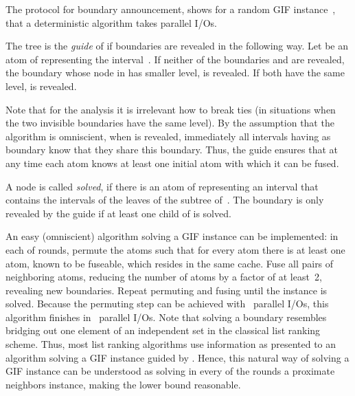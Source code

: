 \documentclass[envcountsame]{llncs}
\def\bO#1{\printmath{\mathcal{O}\left(#1\right)}}
\def\bOm#1{\printmath{\Omega \left(#1\right)}}
\begin{document}
The protocol for boundary announcement, shows for a random GIF instance~\gifInstance, that a deterministic algorithm takes \bOm{\log^2\inputSize} parallel I/Os.

\begin{definition}
\label{definitionAnnouncingGuide}
	The tree \binaryTreeOf{\gifInstance} is the \emph{guide} of \gifInstance if boundaries are revealed in the following way.
        Let  be an atom of \gifInstance representing the interval~.
        If neither of the boundaries   and  are revealed, the boundary whose node in \binaryTreeOf{\gifInstance} has smaller level, is revealed. 
        If both have the same level,  is revealed. 
\end{definition}

Note that for the analysis it is irrelevant how to break ties (in situations when the two invisible boundaries have the same level).
By the assumption that the algorithm is omniscient, when  is revealed, immediately all intervals having  as boundary know that they share this boundary.
Thus, the guide ensures that at any time each atom knows at least one initial atom with which it can be fused.

A node  is called \emph{solved}, if there is an atom of \gifInstance representing an interval that contains the intervals of the leaves of the subtree of~.
The boundary  is only revealed by the guide if at least one child of  is solved. 

An easy (omniscient) algorithm solving a GIF instance can be implemented: in each of  rounds, permute the atoms such that for every atom there is at least one atom, known to be fuseable, which resides in the same cache. Fuse all pairs of neighboring atoms, reducing the number of atoms by a factor of at least~2, revealing new boundaries.
Repeat permuting and fusing until the instance is solved.
Because the permuting step can be achieved with~\bO{\log \inputSize} parallel I/Os, this algorithm finishes in~\bO{\log^2 \inputSize} parallel I/Os.
Note that solving a boundary resembles bridging out one element of an independent set in the classical list ranking scheme.  
Thus, most list ranking algorithms use information as presented to an algorithm solving a GIF instance \gifInstance guided by \binaryTreeOf{\gifInstance}.
Hence, this natural way of solving a GIF instance can be understood as solving in every of the  rounds a proximate neighbors instance, making the \bOm{\log^2\inputSize} lower bound reasonable.

\end{document}
